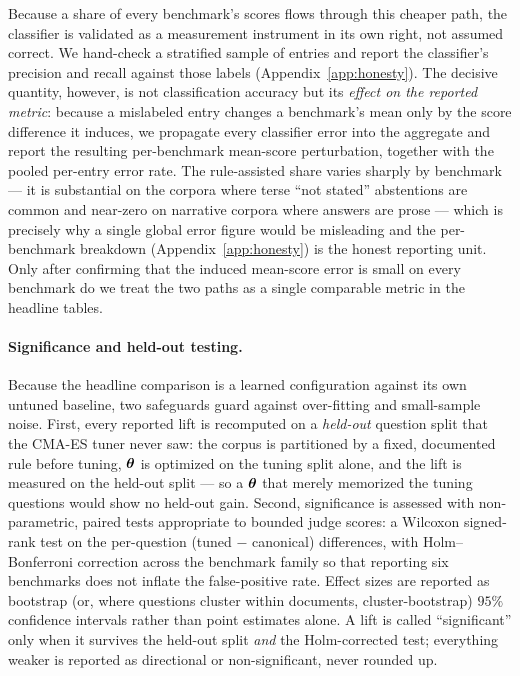 Because a share of every benchmark's scores flows through this cheaper path, the
classifier is validated as a measurement instrument in its own right, not assumed
correct. We hand-check a stratified sample of entries and report the classifier's
precision and recall against those labels
(Appendix~\ref{app:honesty}). The decisive quantity, however, is not
classification accuracy but its \emph{effect on the reported metric}: because a
mislabeled entry changes a benchmark's mean only by the score difference it
induces, we propagate every classifier error into the aggregate and report the
resulting per-benchmark mean-score perturbation, together with the pooled
per-entry error rate. The rule-assisted share varies sharply by benchmark --- it
is substantial on the corpora where terse ``not stated'' abstentions are common
and near-zero on narrative corpora where answers are prose --- which is precisely
why a single global error figure would be misleading and the per-benchmark
breakdown (Appendix~\ref{app:honesty}) is the honest reporting unit. Only after
confirming that the induced mean-score error is small on every benchmark do we
treat the two paths as a single comparable metric in the headline tables.

\paragraph{Significance and held-out testing.} Because the headline comparison
is a learned configuration against its own untuned baseline, two safeguards guard
against over-fitting and small-sample noise. First, every reported lift is
recomputed on a \emph{held-out} question split that the CMA-ES tuner never saw:
the corpus is partitioned by a fixed, documented rule before tuning, $\boldsymbol{\theta}$
is optimized on the tuning split alone, and the lift is measured on the held-out
split --- so a $\boldsymbol{\theta}$ that merely memorized the tuning questions would show
no held-out gain. Second, significance is assessed with non-parametric, paired
tests appropriate to bounded judge scores: a Wilcoxon signed-rank test on the
per-question (tuned $-$ canonical) differences, with Holm--Bonferroni correction
across the benchmark family so that reporting six benchmarks does not inflate the
false-positive rate. Effect sizes are reported as bootstrap (or, where questions
cluster within documents, cluster-bootstrap) $95\%$ confidence intervals rather
than point estimates alone. A lift is called ``significant'' only when it
survives the held-out split \emph{and} the Holm-corrected test; everything weaker
is reported as directional or non-significant, never rounded up.
